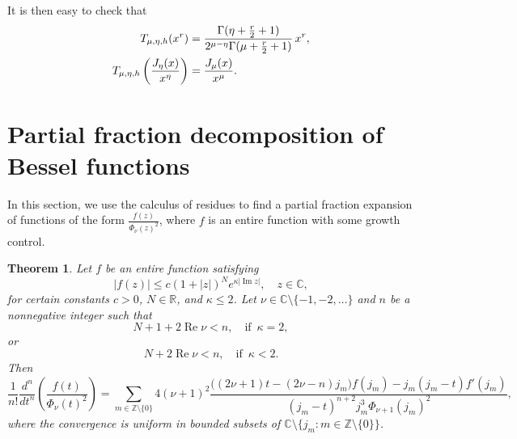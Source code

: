\documentclass[10pt,leqno,a4paper]{article}
\theoremstyle{plain}
\newtheorem{theorem}{Theorem}
\newcommand{\RR}{\mathbb{R}}
\newcommand{\ZZ}{\mathbb{Z}}
\newcommand{\CC}{\mathbb{C}}
\renewcommand{\Im}{\operatorname{Im}}
\renewcommand{\Re}{\operatorname{Re}}
\numberwithin{equation}{section}
\begin{document}
It is then easy to check that
\begin{align}
\notag
   T_{\mu,\eta,h}(x^{r})
   &= \frac{\Gamma(\eta+\frac{r}{2}+1)}{2^{\mu-\eta}\Gamma(\mu+\frac{r}{2}+1)} \,x^{r},
   \\
\label{lab2}
   T_{\mu,\eta,h} \left(\frac{J_\eta(x)}{x^{\eta}}\right)
   &= \frac{J_{\mu}(x)}{x^\mu}.
\end{align}

\section{Partial fraction decomposition of Bessel functions}
\label{s1}

In this section, we use the calculus of residues to find a partial fraction expansion of functions of the form $\frac{f(z)}{\Phi_\nu(z)^2}$, where $f$ is an entire function with some growth control.

\begin{theorem}
\label{teoremacuadrado}
Let $f$ be an entire function satisfying
\[
   |f(z)| \leq c (1+|z|)^N e^{\kappa|\Im z|},
   \quad z \in \CC,
\]
for certain constants $c > 0$, $N \in \RR$, and $\kappa \leq 2$. Let $\nu \in \CC \setminus \{-1,-2,\dots\}$ and $n$ be a nonnegative integer such that
\[
   N + 1 + 2 \Re\nu < n,
   \quad \text{if }\, \kappa = 2,
\]
or
\[
   N + 2 \Re\nu < n,
   \quad \text{if }\, \kappa < 2.
\]
Then
\begin{equation*}
   \frac{1}{n!} \frac{d^n}{dt^n} \left( \frac{f(t)}{\Phi_\nu(t)^2} \right)
   = \sum_{m \in \ZZ \setminus \{0\}} 4(\nu+1)^2
   \frac{\big((2\nu+1) t - (2\nu-n) j_m\big) f(j_m) - j_m(j_m-t) f'(j_m)}
   {(j_m-t)^{n+2} j_m^3 \Phi_{\nu+1}(j_m)^2},
\end{equation*}
where the convergence is uniform in bounded subsets of $\CC \setminus \{j_m : m \in \ZZ \setminus \{0\} \}$.
\end{theorem}
\end{document}
